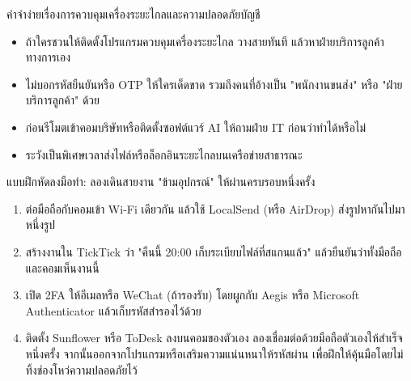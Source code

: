 \begin{tcbwarn}{คำจำง่ายเรื่องการควบคุมเครื่องระยะไกลและความปลอดภัยบัญชี}
\begin{itemize}
  \item ถ้าใครชวนให้ติดตั้งโปรแกรมควบคุมเครื่องระยะไกล วางสายทันที แล้วหาฝ่ายบริการลูกค้าทางการเอง
  \item ไม่บอกรหัสยืนยันหรือ OTP ให้ใครเด็ดขาด รวมถึงคนที่อ้างเป็น "พนักงานขนส่ง" หรือ "ฝ่ายบริการลูกค้า" ด้วย
  \item ก่อนรีโมตเข้าคอมบริษัทหรือติดตั้งซอฟต์แวร์ AI ให้ถามฝ่าย IT ก่อนว่าทำได้หรือไม่
  \item ระวังเป็นพิเศษเวลาส่งไฟล์หรือล็อกอินระยะไกลบนเครือข่ายสาธารณะ
\end{itemize}

\end{tcbwarn}

\begin{tcbpractice}{แบบฝึกหัดลงมือทำ: ลองเดินสายงาน "ข้ามอุปกรณ์" ให้ผ่านครบรอบหนึ่งครั้ง}
\begin{enumerate}
  \item ต่อมือถือกับคอมเข้า Wi-Fi เดียวกัน แล้วใช้ LocalSend (หรือ AirDrop) ส่งรูปหากันไปมาหนึ่งรูป
  \item สร้างงานใน TickTick ว่า "คืนนี้ 20:00 เก็บระเบียบไฟล์ที่สแกนแล้ว" แล้วยืนยันว่าทั้งมือถือและคอมเห็นงานนี้
  \item เปิด 2FA ให้อีเมลหรือ WeChat (ถ้ารองรับ) โดยผูกกับ Aegis หรือ Microsoft Authenticator แล้วเก็บรหัสสำรองไว้ด้วย
  \item ติดตั้ง Sunflower หรือ ToDesk ลงบนคอมของตัวเอง ลองเชื่อมต่อด้วยมือถือตัวเองให้สำเร็จหนึ่งครั้ง จากนั้นออกจากโปรแกรมหรือเสริมความแน่นหนาให้รหัสผ่าน เพื่อฝึกให้คุ้นมือโดยไม่ทิ้งช่องโหว่ความปลอดภัยไว้
\end{enumerate}

\end{tcbpractice}
